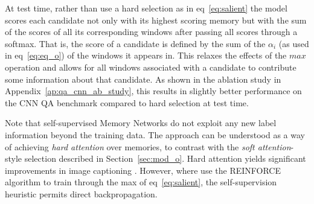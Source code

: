 %

%


%
At test time, rather than use a hard selection as in eq~\eqref{eq:salient}
the model scores each candidate not only with its highest scoring memory
but with the sum of the scores of all its corresponding windows after passing all scores through a softmax.  That is, the score of a candidate is defined by the sum of the $\alpha_i$ (as used in eq~\eqref{eq:eq_o}) of the windows it appears in. This relaxes the effects of the \(max\) operation and allows for all windows associated with a candidate to contribute some information about that candidate. As shown in the ablation study in Appendix~\ref{ap:qa_cnn_ab_study}, this results in slightly better performance on the CNN QA benchmark compared to hard selection at test time.

Note that self-supervised Memory Networks do not exploit any new label information beyond the training data. %
The approach can be understood as a way of achieving \emph{hard attention} over memories, to contrast with the \emph{soft attention}-style selection described in Section~\ref{sec:mod_o}. Hard attention yields significant improvements in image captioning \citep{xu2015show}. However, where \cite{xu2015show} use the REINFORCE algorithm \citep{williams1992simple} to train through the max of eq~\eqref{eq:salient}, the self-supervision heuristic permits direct backpropagation.






